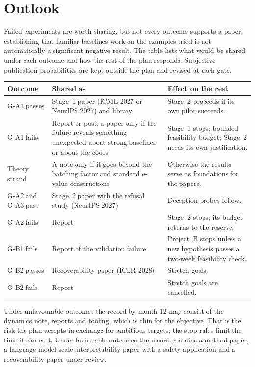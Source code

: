 \documentclass[11pt,a4paper]{article}
\begin{document}
\section{Outlook}
\label{sec:outlook}

Failed experiments are worth sharing, but not every outcome supports a
paper: establishing that familiar baselines work on the examples tried is
not automatically a significant negative result. The table lists what
would be shared under each outcome and how the rest of the plan responds.
Subjective publication probabilities are kept outside the plan and revised
at each gate.

\begin{center}
\begin{tabular}{@{}P{3.4cm}P{6.0cm}P{5.5cm}@{}}
\toprule
Outcome & Shared as & Effect on the rest \\
\midrule
G-A1 passes & Stage~1 paper (ICML 2027 or NeurIPS 2027) and library &
Stage~2 proceeds if its own pilot succeeds. \\ \addlinespace
G-A1 fails & Report or post; a paper only if the failure reveals something
unexpected about strong baselines or about the codes & Stage~1 stops;
bounded feasibility budget; Stage~2 needs its own justification. \\
\addlinespace
Theory strand & A note only if it goes beyond the batching factor and
standard e-value constructions & Otherwise the results serve as
foundations for the papers. \\ \addlinespace
G-A2 and G-A3 pass & Stage~2 paper with the refusal study (NeurIPS 2027) &
Deception probes follow. \\ \addlinespace
G-A2 fails & Report & Stage~2 stops; its budget returns to the reserve. \\
\addlinespace
G-B1 fails & Report of the validation failure & Project~B stops unless a
new hypothesis passes a two-week feasibility check. \\ \addlinespace
G-B2 passes & Recoverability paper (ICLR 2028) & Stretch goals. \\
\addlinespace
G-B2 fails & Report & Stretch goals are cancelled. \\
\bottomrule
\end{tabular}
\end{center}

\noindent Under unfavourable outcomes the record by month 12 may consist of
the dynamics note, reports and tooling, which is thin for the objective.
That is the risk the plan accepts in exchange for ambitious targets; the
stop rules limit the time it can cost. Under favourable outcomes the record
contains a method paper, a language-model-scale interpretability paper
with a safety application and a recoverability paper under review.
\end{document}
